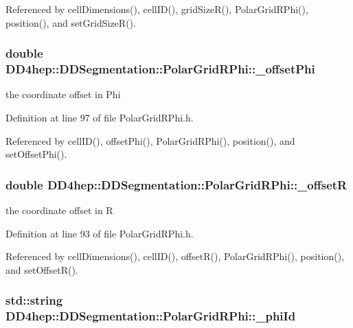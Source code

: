 Referenced by cellDimensions(), cellID(), gridSizeR(), PolarGridRPhi(), position(), and setGridSizeR().\hypertarget{class_d_d4hep_1_1_d_d_segmentation_1_1_polar_grid_r_phi_aad87313faf21c764d78f84130c87c178}{
\subsubsection[{\_\-offsetPhi}]{\setlength{\rightskip}{0pt plus 5cm}double {\bf DD4hep::DDSegmentation::PolarGridRPhi::\_\-offsetPhi}}}
\label{class_d_d4hep_1_1_d_d_segmentation_1_1_polar_grid_r_phi_aad87313faf21c764d78f84130c87c178}


the coordinate offset in Phi 

Definition at line 97 of file PolarGridRPhi.h.

Referenced by cellID(), offsetPhi(), PolarGridRPhi(), position(), and setOffsetPhi().\hypertarget{class_d_d4hep_1_1_d_d_segmentation_1_1_polar_grid_r_phi_aea2278c6ee89eedb09b9ef2fce3a8de0}{
\subsubsection[{\_\-offsetR}]{\setlength{\rightskip}{0pt plus 5cm}double {\bf DD4hep::DDSegmentation::PolarGridRPhi::\_\-offsetR}}}
\label{class_d_d4hep_1_1_d_d_segmentation_1_1_polar_grid_r_phi_aea2278c6ee89eedb09b9ef2fce3a8de0}


the coordinate offset in R 

Definition at line 93 of file PolarGridRPhi.h.

Referenced by cellDimensions(), cellID(), offsetR(), PolarGridRPhi(), position(), and setOffsetR().\hypertarget{class_d_d4hep_1_1_d_d_segmentation_1_1_polar_grid_r_phi_aeb72e70920f4eb466de969281d984053}{
\subsubsection[{\_\-phiId}]{\setlength{\rightskip}{0pt plus 5cm}std::string {\bf DD4hep::DDSegmentation::PolarGridRPhi::\_\-phiId}}}
\label{class_d_d4hep_1_1_d_d_segmentation_1_1_polar_grid_r_phi_aeb72e70920f4eb466de969281d984053}


